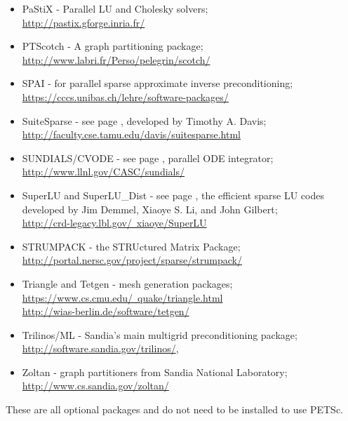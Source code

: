 \begin{itemize}
             \item PaStiX -     Parallel LU and Cholesky solvers; \\\href{http://pastix.gforge.inria.fr/}{http://pastix.gforge.inria.fr/}
  \item PTScotch -    A graph partitioning package; \\\href{http://www.labri.fr/Perso/~pelegrin/scotch/}{http://www.labri.fr/Perso/pelegrin/scotch/}
  \item SPAI -        for parallel sparse approximate inverse preconditioning;\\ \href{https://cccs.unibas.ch/lehre/software-packages/}{https://cccs.unibas.ch/lehre/software-packages/}
  \item SuiteSparse - see page \pageref{sec_externalsol}, developed by Timothy A. Davis;\\
                    \href{http://faculty.cse.tamu.edu/davis/suitesparse.html}{http://faculty.cse.tamu.edu/davis/suitesparse.html}
  \item SUNDIALS/CVODE - see page \pageref{sec_sundials}, parallel ODE integrator;\\
                     \href{http://www.llnl.gov/CASC/sundials/}{http://www.llnl.gov/CASC/sundials/}
  \item SuperLU and SuperLU\_Dist - see page \pageref{sec_externalsol},
                    the efficient sparse LU codes developed by Jim Demmel,  Xiaoye S. Li, and John Gilbert;\\
                    \href{http://crd-legacy.lbl.gov/~xiaoye/SuperLU}{http://crd-legacy.lbl.gov/~xiaoye/SuperLU}
                    \item STRUMPACK - the STRUctured Matrix Package; \\
                    \href{http://portal.nersc.gov/project/sparse/strumpack/}{http://portal.nersc.gov/project/sparse/strumpack/}
  \item Triangle and Tetgen - mesh generation packages; \\
    \href{https://www.cs.cmu.edu/~quake/triangle.html}{https://www.cs.cmu.edu/~quake/triangle.html}\\
    \href{http://wias-berlin.de/software/tetgen/}{http://wias-berlin.de/software/tetgen/}
  \item Trilinos/ML - Sandia's main multigrid preconditioning package; \\\href{http://software.sandia.gov/trilinos/}{http://software.sandia.gov/trilinos/},
  \item Zoltan - graph partitioners from Sandia National Laboratory;\\ \href{http://www.cs.sandia.gov/zoltan/}{http://www.cs.sandia.gov/zoltan/}
\end{itemize}
These are all optional packages and do not need to be installed to use PETSc.

